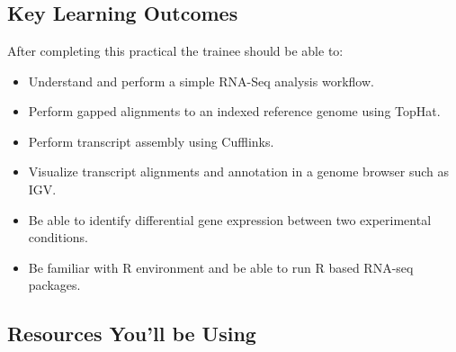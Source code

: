 
\chapter{\moduleTitle}
\newpage

\section{Key Learning Outcomes}

After completing this practical the trainee should be able to:
\begin{itemize}
  \item Understand and perform a simple RNA-Seq analysis workflow.
  \item Perform gapped alignments to an indexed reference genome using TopHat.
  \item Perform transcript assembly using Cufflinks.
  \item Visualize transcript alignments and annotation in a genome browser such as IGV.
  \item Be able to identify differential gene expression between two experimental conditions.
  \item Be familiar with R environment and be able to run R based RNA-seq packages.
\end{itemize}

\section{Resources You'll be Using}
 

